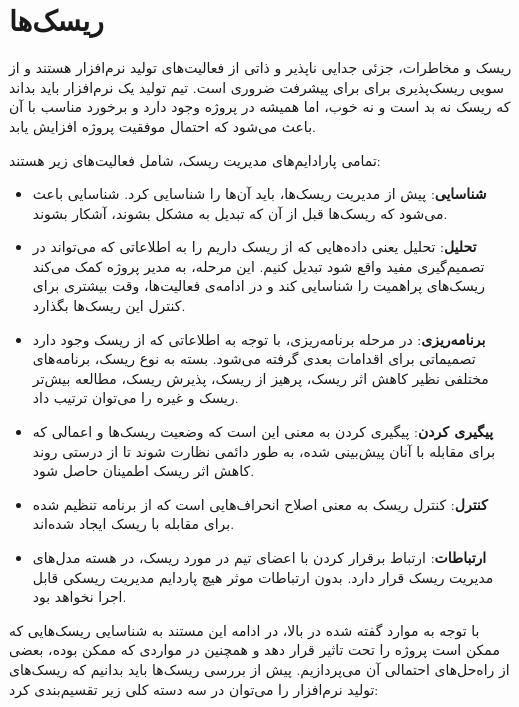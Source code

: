 
\chapter{ریسک‌ها}


ریسک و مخاطرات، جزئی جدایی ناپذیر و ذاتی از فعالیت‌های تولید نرم‌افزار هستند و از سویی ریسک‌پذیری برای برای پیشرفت ضروری است. تیم تولید یک نرم‌افزار باید بداند که ریسک نه بد است و نه خوب، اما همیشه در پروژه وجود دارد و برخورد مناسب با آن باعث می‌شود که احتمال موفقیت پروژه افزایش یابد.


تمامی پارادایم‌های مدیریت ریسک، شامل فعالیت‌های زیر هستند:

\begin{itemize}
	\item
	 \textbf{شناسایی}:
 پیش از مدیریت ریسک‌ها، باید آن‌ها را شناسایی کرد. شناسایی باعث می‌شود که ریسک‌ها قبل از آن‌ که تبدیل به مشکل بشوند، آشکار بشوند. 
	 
	 \item
	 \textbf{تحلیل}:
 تحلیل یعنی داده‌هایی که از ریسک داریم را به اطلاعاتی که می‌تواند در تصمیم‌گیری مفید واقع شود تبدیل کنیم. این مرحله، به مدیر پروژه کمک می‌کند ریسک‌های پراهمیت را شناسایی کند و در ادامه‌ی فعالیت‌ها، وقت بیشتری برای کنترل این ریسک‌ها بگذارد.
	 
	 \item 
	 \textbf{برنامه‌ریزی}:
 در مرحله برنامه‌ریزی، با توجه به اطلاعاتی که از ریسک وجود دارد تصمیماتی برای اقدامات بعدی گرفته می‌شود. بسته به نوع ریسک، برنامه‌های مختلفی نظیر کاهش اثر ریسک، پرهیز از ریسک، پذیرش ریسک، مطالعه بیش‌تر ریسک و غیره را می‌توان ترتیب داد.
	 
	 \item
	\textbf{پیگیری کردن}:
پیگیری کردن به معنی این است که وضعیت ریسک‌ها و اعمالی که برای مقابله با آنان پیش‌بینی شده، به طور دائمی نظارت شوند تا از درستی روند کاهش اثر ریسک اطمینان حاصل شود.
	 
	 \item 
	\textbf{کنترل}:
 کنترل ریسک به معنی اصلاح انحراف‌هایی است که از برنامه تنظیم شده برای مقابله با ریسک ایجاد شده‌اند.
	 
	 \item
	\textbf{ارتباطات}:
 ارتباط برقرار کردن با اعضای تیم در مورد ریسک، در هسته مدل‌های مدیریت ریسک قرار دارد. بدون ارتباطات موثر هیچ پاردایم مدیریت ریسکی قابل اجرا نخواهد بود.
	 
\end{itemize}


با توجه به موارد گفته شده در بالا، در ادامه این مستند به شناسایی ریسک‌هایی که ممکن است پروژه را تحت تاثیر قرار دهد و همچنین در مواردی که ممکن بوده، بعضی از راه‌حل‌های احتمالی آن می‌پردازیم. پیش از بررسی ریسک‌ها باید بدانیم که ریسک‌های تولید نرم‌افزار را می‌توان در سه دسته کلی زیر تقسیم‌بندی کرد:

